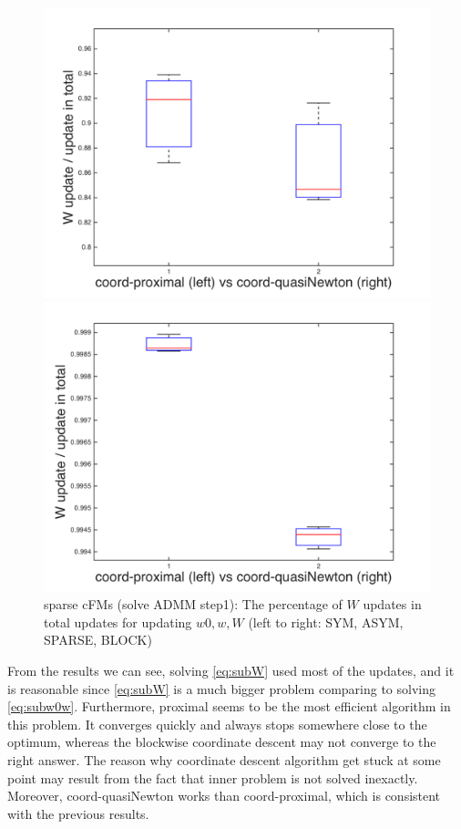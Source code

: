 \documentclass{article}
\begin{document}
\begin{figure}[htbp]
\begin{minipage}{0.24\textwidth}
    \includegraphics[width=1\textwidth]{../yanyu_code/plots/sparse_w0wW_box_p30}
  \end{minipage}
  \hfill
  \begin{minipage}{0.24\textwidth}
    \centering
    \includegraphics[width=1\textwidth]{../yanyu_code/plots/block_w0wW_box_p30}
  \end{minipage}
  \caption{sparse cFMs (solve ADMM step1): The percentage of $W$ updates in total updates for updating $w0, w, W$ (left to right: SYM, ASYM, SPARSE, BLOCK)}
  \label{fig:argminw0wW_ratio}
\end{figure}
From the results we can see, solving \cref{eq:subW} used most of the updates, and it is reasonable since \cref{eq:subW} is a much bigger problem comparing to solving \cref{eq:subw0w}. Furthermore, proximal seems to be the most efficient algorithm in this problem. It converges quickly and always stops somewhere close to the optimum, whereas the blockwise coordinate descent may not converge to the right answer. The reason why coordinate descent algorithm get stuck at some point may result from the fact that inner problem is not solved inexactly. Moreover, coord-quasiNewton works than coord-proximal, which is consistent with the previous results. 
\end{document}
